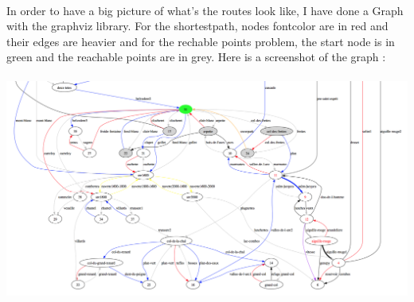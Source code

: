 \documentclass{article}
\begin{document}
    \paragraph{}
        In order to have a big picture of what's the routes look like, I have done a Graph with the graphviz library. For the shortestpath, nodes fontcolor are in red and their edges are heavier and for the rechable points problem, the start node is in green and the reachable points are in grey. Here is a screenshot of the graph : 
    \paragraph{}
        \includegraphics[scale=0.43]{example2.png}
\end{document}
